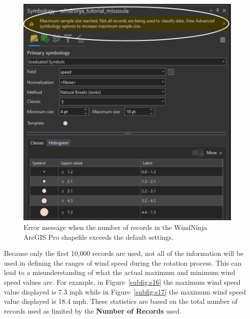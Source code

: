 \documentclass[12pt]{article}
\begin{document}
\begin{figure}[H]
	\centering
	\includegraphics[scale=0.55]{arc_7.png}
	\caption{Error message when the number of records in the WindNinja ArcGIS Pro shapefile exceeds the default settings.}
\label{fig:Figure16}
\end{figure}

Because only the first 10,000 records are used, not all of the information will be used in defining the ranges of wind speed during the rotation process. This can lead to a misunderstanding of what the actual maximum and minimum wind speed values are. For example, in Figure~\ref{subfig:s16} the maximum wind speed value displayed is 7.3 mph while in Figure~\ref{subfig:s17} the maximum wind speed value displayed is 18.4 mph. These statistics are based on the total number of records used as limited by the \textbf{Number of Records} used.
\end{document}
